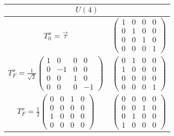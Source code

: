 \documentclass{article}
\begin{document}
\begin{table}[h]
\centering
\begin{tabular}{c|c}
\hline
\multicolumn{2}{c}{$U(4)$} \\
\hline
\multirow{2}{*}{$T^x_0 = \overrightarrow{\tau}$} & 
\multirow{2}{*}{$\begin{pmatrix}
1 & 0 & 0 & 0 \\
0 & 1 & 0 & 0 \\
0 & 0 & 1 & 0 \\
0 & 0 & 0 & 1
\end{pmatrix}$} \\
& 
$\begin{pmatrix}
\not\!\!{\tau} & 0 \\
0 & \not\!\!{\tau}
\end{pmatrix}$ \\
\hline
\multirow{2}{*}{$T^x_F = \frac{1}{\sqrt{2}} \begin{pmatrix}
1 & 0 & 0 & 0 \\
0 & -1 & 0 & 0 \\
0 & 0 & 1 & 0 \\
0 & 0 & 0 & -1
\end{pmatrix}$} &
\multirow{2}{*}{$\begin{pmatrix}
0 & 1 & 0 & 0 \\
1 & 0 & 0 & 0 \\
0 & 0 & 0 & 0 \\
0 & 0 & 0 & 1
\end{pmatrix}$} \\
& 
$\begin{pmatrix}
a & -i & 0 & 0 \\
-i & a & 0 & 0 \\
0 & 0 & 0 & 0 \\
0 & 0 & -i & 0
\end{pmatrix}$ \\
\hline
\multirow{2}{*}{$T^x_F = \frac{1}{2} \begin{pmatrix}
0 & 0 & 1 & 0 \\
0 & 0 & 0 & 0 \\
1 & 0 & 0 & 0 \\
0 & 0 & 0 & 0
\end{pmatrix}$} &
\multirow{2}{*}{$\begin{pmatrix}
0 & 0 & 0 & 0 \\
0 & 0 & 1 & 0 \\
0 & 1 & 0 & 0 \\
1 & 0 & 0 & 0
\end{pmatrix}$} \\

\end{tabular}
\end{table}
\end{document}
